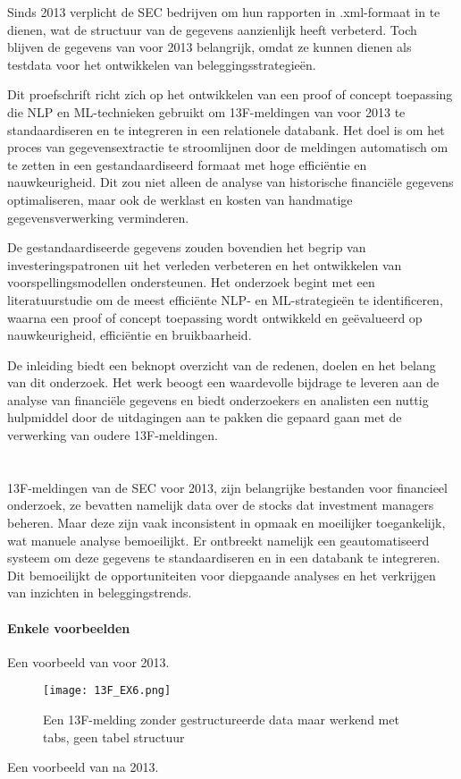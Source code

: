 Sinds 2013 verplicht de SEC bedrijven om hun rapporten in .xml-formaat in te dienen, wat de structuur van de gegevens aanzienlijk heeft verbeterd. Toch blijven de gegevens van voor 2013 belangrijk, omdat ze kunnen dienen als testdata voor het ontwikkelen van beleggingsstrategieën.

Dit proefschrift richt zich op het ontwikkelen van een proof of concept toepassing die NLP en ML-technieken gebruikt om 13F-meldingen van voor 2013 te standaardiseren en te integreren in een relationele databank. Het doel is om het proces van gegevensextractie te stroomlijnen door de meldingen automatisch om te zetten in een gestandaardiseerd formaat met hoge efficiëntie en nauwkeurigheid. Dit zou niet alleen de analyse van historische financiële gegevens optimaliseren, maar ook de werklast en kosten van handmatige gegevensverwerking verminderen.

De gestandaardiseerde gegevens zouden bovendien het begrip van investeringspatronen uit het verleden verbeteren en het ontwikkelen van voorspellingsmodellen ondersteunen. Het onderzoek begint met een literatuurstudie om de meest efficiënte NLP- en ML-strategieën te identificeren, waarna een proof of concept toepassing wordt ontwikkeld en geëvalueerd op nauwkeurigheid, efficiëntie en bruikbaarheid.

De inleiding biedt een beknopt overzicht van de redenen, doelen en het belang van dit onderzoek. Het werk beoogt een waardevolle bijdrage te leveren aan de analyse van financiële gegevens en biedt onderzoekers en analisten een nuttig hulpmiddel door de uitdagingen aan te pakken die gepaard gaan met de verwerking van oudere 13F-meldingen.

\section{}%
\label{sec:probleemstelling}

13F-meldingen van de SEC voor 2013, zijn belangrijke bestanden voor financieel onderzoek, ze bevatten namelijk data over de stocks dat investment managers beheren. Maar deze zijn vaak inconsistent in opmaak en moeilijker toegankelijk, wat manuele analyse bemoeilijkt. Er ontbreekt namelijk een geautomatiseerd systeem om deze gegevens te standaardiseren en in een databank te integreren. Dit bemoeilijkt de opportuniteiten voor diepgaande analyses en het verkrijgen van inzichten in beleggingstrends.

\paragraph{Enkele voorbeelden}
Een voorbeeld van voor 2013.
\begin{figure}[hbt!]
    \texttt{[image: 13F\_EX6.png]}
    \caption[13F voorbeeld 7]{\label{fig:voorbeeld voor 2013 - inleiding}Een 13F-melding zonder gestructureerde data maar werkend met tabs, geen tabel structuur}
\end{figure}
Een voorbeeld van na 2013.

